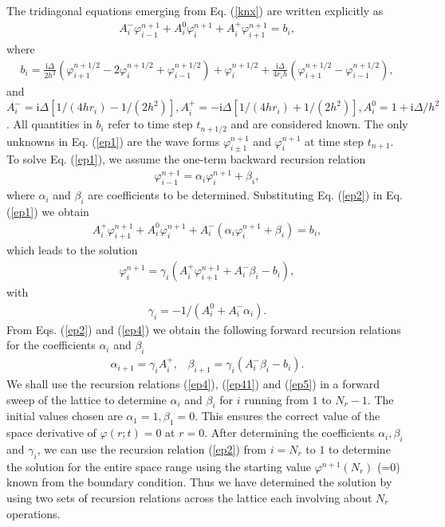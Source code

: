 \documentclass[onecolumn]{elsart3p}
\begin{document}
The tridiagonal equations emerging from Eq. (\ref{knx}) are written
explicitly as
\begin{align}\label{ep1}
A_i^-\varphi^{n+1}_{i-1}+A_i^0\varphi^{n+1}_{i}+
A_i^+\varphi^{n+1}_{i+1}= b_i,
\end{align}
where
\begin{align}
b_i=\frac{\mbox{i}\Delta}{2h^2}(\varphi^{n+1/2}_{i+1}-2\varphi_{i}^{n+1/2}
+\varphi^{n+1/2}_{i-1})+\varphi_i^{n+1/2}+\frac{\mbox{i}\Delta}{4r_ih}
(\varphi^{n+1/2}_{i+1}-\varphi^{n+1/2}_{i-1}),
\end{align}
and $A_i^-= \mbox{i}\Delta[1/(4hr_i) -1/(2h^2)],
A_i^+= -\mbox{i}\Delta[1/(4hr_i) +1/(2h^2)],
A_i^0 =
1+\mbox{i}
\Delta/h^2$. All quantities in $b_i$ refer to time step $t_{n+1/2}$
and are considered known. The only unknowns in Eq. (\ref{ep1}) are the
wave forms $\varphi^{n+1}_{i\pm 1}$ and $\varphi^{n+1}_{i}$ at time
step $t_{n+1}$. To solve Eq. (\ref{ep1}), we assume the one-term
backward recursion relation
\begin{align}\label{ep2}
\varphi^{n+1}_{i-1}=\alpha_i\varphi^{n+1}_{i}+\beta_i,
\end{align}
where $\alpha_i$ and $\beta_i$ are coefficients to be determined.
Substituting Eq. (\ref{ep2}) in Eq. (\ref{ep1}) we obtain
\begin{align}\label{ep3}
A_i^+\varphi^{n+1}_{i+1}+A_i^0\varphi^{n+1}_{i}+
A_i^-(\alpha_i \varphi^{n+1}_{i}+\beta_i)= b_i,
\end{align}
which leads to the solution
\begin{align}\label{ep4}
\varphi_i^{n+1}=\gamma_i(A_i^+ \varphi_{i+1}^{n+1}+A_i^-\beta_i-b_i),
\end{align}
with
\begin{align}\label{ep41}
\gamma_i=-1/(A_i^0+A_i^-\alpha_i).
\end{align}
From Eqs. (\ref{ep2}) and (\ref{ep4}) we obtain the following
forward
recursion relations for the coefficients $\alpha_i$ and $\beta_i$
\begin{align}\label{ep5}
\alpha_{i+1}=\gamma_iA_i^+, \;\;\; \beta_{i+1}=
\gamma_i(A_i^-\beta_i-b_i).
\end{align}
We shall use the recursion relations (\ref{ep4}), (\ref{ep41}) and (\ref{ep5})
in a forward sweep of the lattice to determine $\alpha_i$ and $\beta_i$ for $i$
running from $1$  to $N_r-1$. The initial values chosen are $\alpha_{1}=1,
\beta_{1} =0.$ This ensures the correct value of the space derivative of
$\varphi(r;t)=0$ at $r=0$. After determining the coefficients $\alpha_i,
\beta_i$ and $\gamma_i$, we can use the recursion relation (\ref{ep2}) from
$i=N_r$ to $1$ to determine the solution for the entire space range using the
starting value $\varphi^{n+1}(N_r)$  (=0) known from the boundary condition.
Thus we have determined the solution by using two sets of recursion relations
across the lattice each involving about $N_r$ operations.
\end{document}
